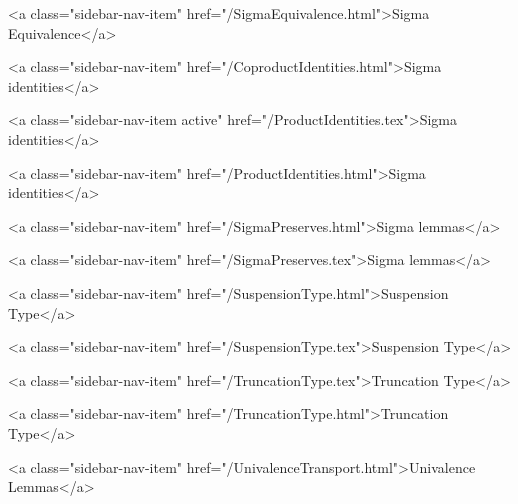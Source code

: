       
    
      
        
          <a class="sidebar-nav-item" href="/SigmaEquivalence.html">Sigma Equivalence</a>
        
      
    
      
        
          <a class="sidebar-nav-item" href="/CoproductIdentities.html">Sigma identities</a>
        
      
    
      
        
          <a class="sidebar-nav-item active" href="/ProductIdentities.tex">Sigma identities</a>
        
      
    
      
        
          <a class="sidebar-nav-item" href="/ProductIdentities.html">Sigma identities</a>
        
      
    
      
        
          <a class="sidebar-nav-item" href="/SigmaPreserves.html">Sigma lemmas</a>
        
      
    
      
        
          <a class="sidebar-nav-item" href="/SigmaPreserves.tex">Sigma lemmas</a>
        
      
    
      
        
          <a class="sidebar-nav-item" href="/SuspensionType.html">Suspension Type</a>
        
      
    
      
        
          <a class="sidebar-nav-item" href="/SuspensionType.tex">Suspension Type</a>
        
      
    
      
        
          <a class="sidebar-nav-item" href="/TruncationType.tex">Truncation Type</a>
        
      
    
      
        
          <a class="sidebar-nav-item" href="/TruncationType.html">Truncation Type</a>
        
      
    
      
        
          <a class="sidebar-nav-item" href="/UnivalenceTransport.html">Univalence Lemmas</a>
        
